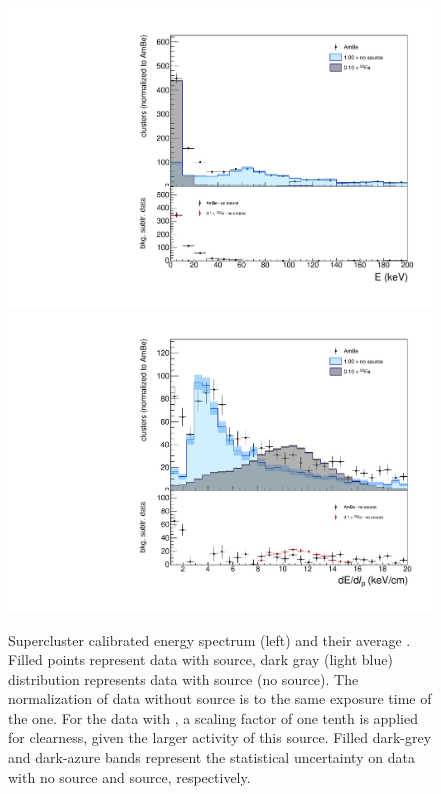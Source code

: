 \begin{figure}[ht]
  \begin{center}
  \includegraphics[width=0.45\linewidth]{figures/energyExt}
  \includegraphics[width=0.45\linewidth]{figures/dedx}

  \caption{Supercluster calibrated energy spectrum (left) and their
    average \dedl. Filled points represent data with \ambe source,
    dark gray (light blue) distribution represents data with \fe
    source (no source).  The normalization of data without source is
    to the same exposure time of the \ambe one. For the data with \fe,
    a scaling factor of one tenth is applied for clearness, given the
    larger activity of this source. Filled dark-grey and dark-azure
    bands represent the statistical uncertainty on data with no source
    and \fe source, respectively. \label{fig:energy}}

\end{center}
\end{figure}

